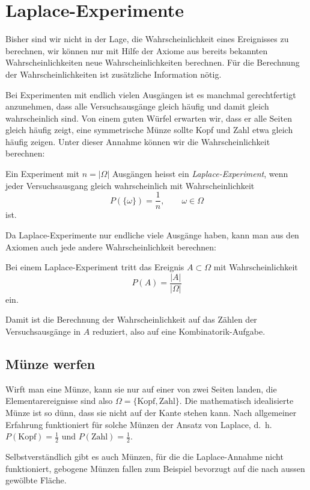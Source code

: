 \section{Laplace-Experimente} \label{section-laplace-ereignisse}
Bisher sind wir nicht in der Lage, die Wahrscheinlichkeit eines Ereignisses
zu berechnen, wir können nur mit Hilfe der Axiome aus bereits bekannten
Wahrscheinlichkeiten neue Wahrscheinlichkeiten berechnen.
Für die Berechnung der Wahrscheinlichkeiten ist zusätzliche
Information nötig.

Bei Experimenten mit endlich vielen Ausgängen ist es manchmal gerechtfertigt
anzunehmen, dass alle Versuchsausgänge gleich häufig und damit gleich
wahrscheinlich sind.
Von einem guten Würfel erwarten wir, dass er alle Seiten gleich häufig
zeigt, eine symmetrische Münze sollte Kopf und Zahl etwa gleich häufig
zeigen.
Unter dieser Annahme können wir die Wahrscheinlichkeit berechnen:

\begin{definition}
Ein Experiment mit $n=|\Omega|$ Ausgängen heisst ein {\em Laplace-Experiment},
wenn jeder Versuchsausgang gleich wahrscheinlich mit Wahrscheinlichkeit
\[
P(\{\omega\})=\frac1n,\qquad\omega\in\Omega
\]
ist.
\end{definition}

Da Laplace-Experimente nur endliche viele Ausgänge haben, kann man aus
den Axiomen auch jede andere Wahrscheinlichkeit berechnen:

\begin{satz}
Bei einem Laplace-Experiment tritt das Ereignis $A\subset\Omega$ mit
Wahrscheinlichkeit
\[
P(A)=\frac{|A|}{|\Omega|}
\]
ein.
\end{satz}
Damit ist die Berechnung der Wahrscheinlichkeit auf das Zählen der 
Versuchsausgänge in $A$ reduziert, also auf eine Kombinatorik-Aufgabe.

\subsection{Münze werfen}
Wirft man eine Münze, kann sie nur auf einer von zwei Seiten landen,
die Elementarereignisse sind also $\Omega = \{\text{Kopf}, \text{Zahl}\}$.
Die mathematisch idealisierte Münze ist so dünn, dass sie nicht auf
der Kante stehen kann.
Nach allgemeiner Erfahrung funktioniert für
solche Münzen der Ansatz von Laplace, d.~h.~$P(\text{Kopf}) = \frac12$
und $P(\text{Zahl})=\frac12$.

Selbstverständlich gibt es auch Münzen, für die die Laplace-Annahme
nicht funktioniert, gebogene Münzen fallen zum Beispiel bevorzugt auf die
nach aussen gewölbte Fläche.

